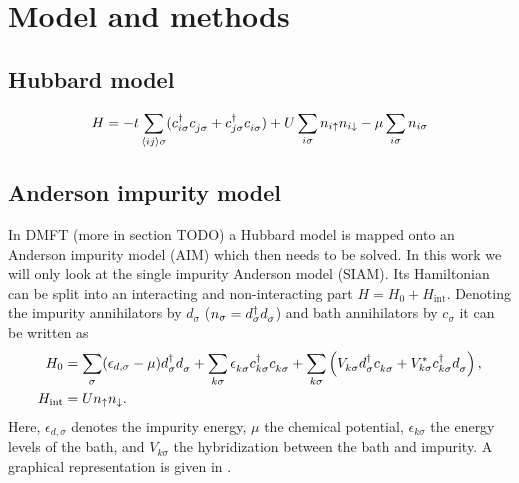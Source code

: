 
\chapter{Model and methods}

\section{Hubbard model}

\begin{equation}
    H
    =
    -t\sum_{\langle i j\rangle\sigma}
    (c^\dag_{i\sigma} c^{\pdag}_{j\sigma} + c^\dag_{j\sigma} c^{\pdag}_{i\sigma})
    +
    U\sum_{i\sigma} n_{i\uparrow} n_{i\downarrow}
    -
    \mu\sum_{i\sigma} n_{i\sigma}
\end{equation}

\section{Anderson impurity model}

In DMFT (more in section TODO) a Hubbard model is mapped onto an Anderson impurity model (AIM)
which then needs to be solved.
In this work we will only look at the single impurity Anderson model (SIAM).
Its Hamiltonian can be split into an interacting and non-interacting part
$H = H_0 + H_\mathrm{int}$.
Denoting the impurity annihilators by $d_\sigma$ ($n_\sigma = d^\dag_\sigma d^{\pdag}_\sigma$)
and bath annihilators by $c_\sigma$
it can be written as
\begin{align}
    H_0
     & =
    \sum_{\pk\sigma} (\epsilon_{d,\sigma} - \mu) d^\dag_{\pk\sigma} d^{\pdag}_{\pk\sigma}
    +
    \sum_{k\sigma} \epsilon_{k\sigma}^{\pdag} c^\dag_{k\sigma} c^{\pdag}_{k\sigma}
    +
    \sum_{k\sigma} \left(V^{\ps}_{k\sigma} d^\dag_{\vphantom{k}\sigma} c^{\pdag}_{k\sigma}
    + V_{k\sigma}^* c^\dag_{k\sigma} d^{\pdag}_{\vphantom{k}\sigma} \right),
    \\
    H_\mathrm{int}
     & =
    U n_\uparrow n_\downarrow.
\end{align}
Here,
$\epsilon_{d,\sigma}$ denotes the impurity energy,
$\mu$ the chemical potential,
$\epsilon_{k\sigma}$ the energy levels of the bath,
and $V_{k\sigma}$ the hybridization between the bath and impurity.
A graphical representation is given in .


